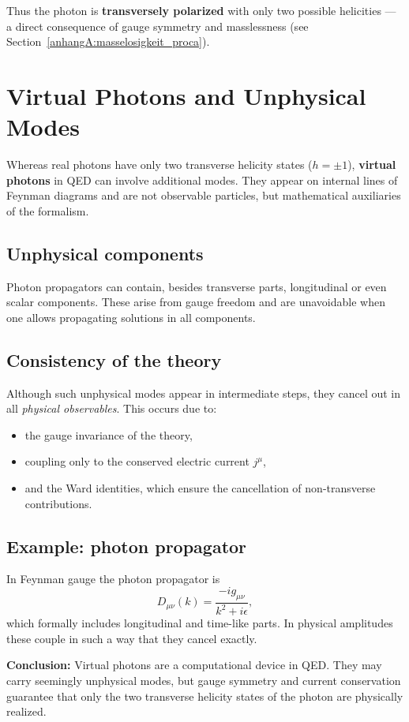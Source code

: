 \medskip
Thus the photon is \textbf{transversely polarized} with only two possible helicities —
a direct consequence of gauge symmetry and masslessness 
(see Section~\ref{anhangA:masselosigkeit_proca}).

\section{Virtual Photons and Unphysical \newline Modes}
\label{anhangA:virtuelle_moden}

Whereas real photons have only two transverse helicity states 
(\( h = \pm 1 \)), \textbf{virtual photons} in QED can involve additional modes. 
They appear on internal lines of Feynman diagrams and are not observable particles,
but mathematical auxiliaries of the formalism.

\subsection*{Unphysical components}
Photon propagators can contain, besides transverse parts,
longitudinal or even scalar components.  
These arise from gauge freedom and are unavoidable when one allows propagating solutions in all components.

\subsection*{Consistency of the theory}

Although such unphysical modes appear in intermediate steps,
they cancel out in all \emph{physical observables}.  
This occurs due to:
\begin{itemize}
	\item the gauge invariance of the theory,
	\item coupling only to the conserved electric current \( j^\mu \),
	\item and the Ward identities, which ensure the cancellation of non-transverse contributions.
\end{itemize}

\subsection*{Example: photon propagator}
In Feynman gauge the photon propagator is
\[
D_{\mu\nu}(k) = \frac{-i g_{\mu\nu}}{k^2 + i\epsilon} ,
\]
which formally includes longitudinal and time-like parts.  
In physical amplitudes these couple in such a way that they cancel exactly.

\medskip
\textbf{Conclusion:}  
Virtual photons are a computational device in QED.  
They may carry seemingly unphysical modes, but gauge symmetry and current conservation 
guarantee that only the two transverse helicity states of the photon are physically realized.
